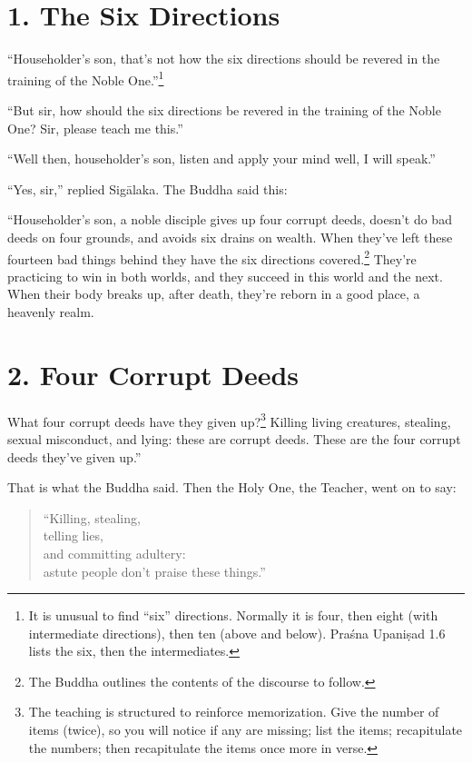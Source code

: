 \documentclass[12pt,openany]{book}%
\begin{document}
\section*{1. The Six Directions }

“Householder’s son, that’s not how the six directions should be revered in the training of the Noble One.”\footnote{It is unusual to find “six” directions. Normally it is four, then eight (with intermediate directions), then ten (above and below). \textsanskrit{Praśna} \textsanskrit{Upaniṣad} 1.6 lists the six, then the intermediates. } 

“But sir, how should the six directions be revered in the training of the Noble One? Sir, please teach me this.” 

“Well then, householder’s son, listen and apply your mind well, I will speak.” 

“Yes, sir,” replied \textsanskrit{Sigālaka}. The Buddha said this: 

“Householder’s son, a noble disciple gives up four corrupt deeds, doesn’t do bad deeds on four grounds, and avoids six drains on wealth. When they’ve left these fourteen bad things behind they have the six directions covered.\footnote{The Buddha outlines the contents of the discourse to follow. } They’re practicing to win in both worlds, and they succeed in this world and the next. When their body breaks up, after death, they’re reborn in a good place, a heavenly realm. 

\section*{2. Four Corrupt Deeds }

What four corrupt deeds have they given up?\footnote{The teaching is structured to reinforce memorization. Give the number of items (twice), so you will notice if any are missing; list the items; recapitulate the numbers; then recapitulate the items once more in verse. } Killing living creatures, stealing, sexual misconduct, and lying: these are corrupt deeds. These are the four corrupt deeds they’ve given up.” 

That is what the Buddha said. Then the Holy One, the Teacher, went on to say: 

\begin{verse}%
“Killing, stealing, \\
telling lies, \\
and committing adultery: \\
astute people don’t praise these things.” 

%
\end{verse}
\end{document}
